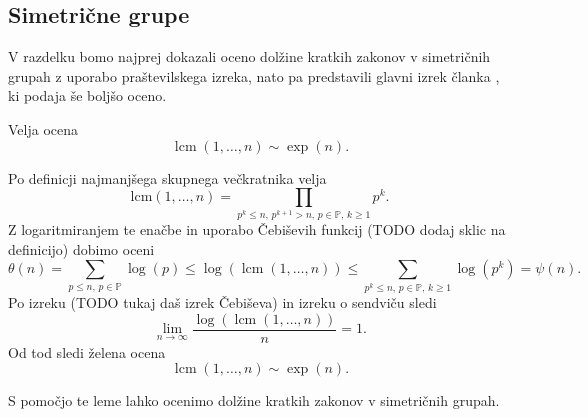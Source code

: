 \subsection{Simetrične grupe}\label{sec_simetricne_grupe}

V razdelku bomo najprej dokazali oceno dolžine kratkih zakonov v simetričnih grupah z uporabo praštevilskega izreka, nato pa predstavili glavni izrek članka \cite{Kozma_Thom_2016}, ki podaja še boljšo oceno.


\begin{lema}
\label{lem_lcm_exp_n}
Velja ocena \begin{equation*}
\operatorname{lcm}(1, \ldots, n) \sim \exp(n).
\end{equation*}  
\end{lema}
\begin{dokaz}
Po definicji najmanjšega skupnega večkratnika velja \begin{equation*}
\text{lcm}(1, \ldots, n) = \prod_{p^{k} \le n, \, p^{k + 1} > n,\,   p \in \mathbb{P}, \, k \ge 1 } p^{k}.
\end{equation*}  
Z logaritmiranjem te enačbe in uporabo Čebiševih funkcij (TODO dodaj sklic na definicijo) dobimo oceni \begin{equation*}
\theta(n) = \sum_{p \le n, \,   p \in \mathbb{P}} \log(p) \le \log(\operatorname{lcm}(1, \ldots ,n)) \le  \sum_{p^{k} \le n, \, p \in \mathbb{P}, \, k \ge 1 } \log(p^{k}) = \psi(n).
\end{equation*}  
Po izreku (TODO tukaj daš izrek Čebiševa) in izreku o sendviču sledi \begin{equation*}
\lim_{n \to \infty} \frac{\log(\operatorname{lcm}(1, \ldots, n))}{n} = 1.
\end{equation*}  
  Od tod sledi želena ocena \begin{equation*}
    \operatorname{lcm}(1, \ldots, n) \sim \exp(n).
\end{equation*} 
\end{dokaz}

S pomočjo te leme lahko ocenimo dolžine kratkih zakonov v simetričnih grupah.

